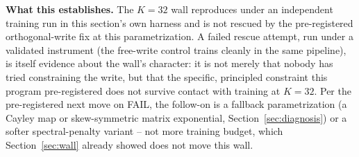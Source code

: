 \textbf{What this establishes.} The $K{=}32$ wall reproduces under an
independent training run in this section's own harness and is not
rescued by the pre-registered orthogonal-write fix at this
parametrization. A failed rescue attempt, run under a validated
instrument (the free-write control trains cleanly in the same pipeline),
is itself evidence about the wall's character: it is not merely that
nobody has tried constraining the write, but that the specific,
principled constraint this program pre-registered does not survive
contact with training at $K{=}32$. Per the
pre-registered next move on FAIL, the follow-on is a fallback
parametrization (a Cayley map or skew-symmetric matrix exponential,
Section~\ref{sec:diagnosis}) or a softer spectral-penalty variant -- not
more training budget, which Section~\ref{sec:wall} already showed does
not move this wall.
